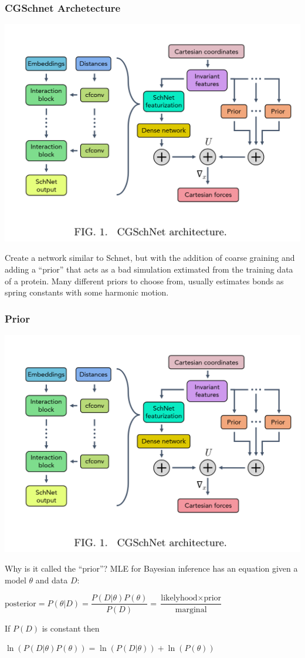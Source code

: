 \documentclass{beamer}
\begin{document}
\begin{frame}
  \frametitle{CGSchnet Archetecture}
  \begin{center}
    \includegraphics[width=0.5\linewidth]{./cgschnet_arch.png}
  \end{center}
  Create a network similar to Schnet, but with the addition of coarse graining and adding a ``prior'' that acts as a bad simulation extimated from the training data of a protein. Many different priors to choose from, usually estimates bonds as spring constants with some harmonic motion.
\end{frame}
\begin{frame}
  \frametitle{Prior}
  \begin{center}
    \includegraphics[width=0.3\linewidth]{./cgschnet_arch.png}
  \end{center}
  \small\begin{block}{Why is it called the ``prior''?}
  MLE for Bayesian inference has an equation given a model $\theta$ and data $D$:\\
  \begin{center}
    $\text{posterior} = P(\theta | D) = \dfrac{P(D | \theta) P(\theta)}{P(D)} = \dfrac{\text{likelyhood} \times \text{prior}}{\text{marginal}}$
  \end{center}
  If $P(D)$ is constant then
  \begin{center}
    $\ln(P(D | \theta) P(\theta)) = \ln(P(D | \theta)) + \ln(P(\theta))$
  \end{center}
  \end{block}
\end{frame}
\end{document}
